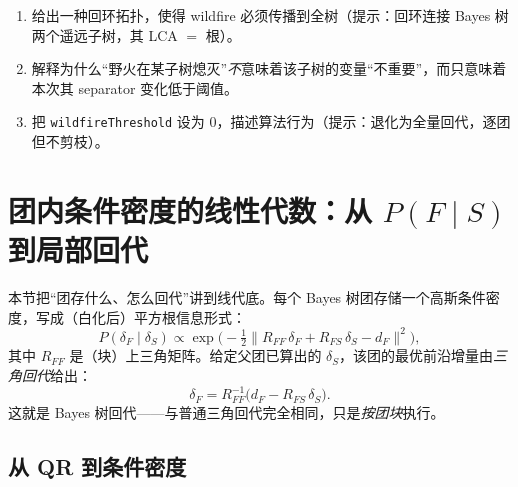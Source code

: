 \begin{practice}
\begin{enumerate}
  \item 给出一种回环拓扑，使得 wildfire 必须传播到全树（提示：回环连接 Bayes 树两个遥远子树，其 LCA $=$ 根）。
  \item 解释为什么“野火在某子树熄灭”\emph{不}意味着该子树的变量“不重要”，而只意味着本次其 separator 变化低于阈值。
  \item 把 \texttt{wildfireThreshold} 设为 $0$，描述算法行为（提示：退化为全量回代，逐团但不剪枝）。
\end{enumerate}
\end{practice}

\section{团内条件密度的线性代数：从 \texorpdfstring{$P(F\mid S)$}{P(F|S)} 到局部回代}
\label{sec:isam-clique-algebra}

本节把“团存什么、怎么回代”讲到线代底。每个 Bayes 树团存储一个高斯条件密度，写成（白化后）平方根信息形式：
\begin{equation}
  P(\delta_F\mid\delta_S)\propto\exp\!\Big(-\tfrac12\big\|R_{FF}\,\delta_F+R_{FS}\,\delta_S-d_F\big\|^2\Big),
  \label{eq:clique-cond}
\end{equation}
其中 $R_{FF}$ 是（块）上三角矩阵。给定父团已算出的 $\delta_S$，该团的最优前沿增量由\emph{三角回代}给出：
\begin{equation}
  \boxed{\;\delta_F=R_{FF}^{-1}\big(d_F-R_{FS}\,\delta_S\big).\;}
  \label{eq:clique-bs}
\end{equation}
这就是 Bayes 树回代——与普通三角回代完全相同，只是\emph{按团块}执行。

\subsection{从 QR 到条件密度}
\label{sec:isam-qr}

